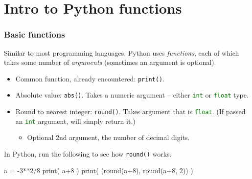 \documentclass{beamer}
\newenvironment{codeblock}
    {\hfill\begin{beamerboxesrounded}[lower=codecol, width=0.8\textwidth]
    \medskip

    }
    { 
    \end{beamerboxesrounded}\hfill
    }
\theoremstyle{example}
\newcommand{\ct}[1]{\lstinline[language=Python,basicstyle=\ttfamily\footnotesize,stringstyle=\small\color{strings}]!#1!}
\newcommand{\ttt}[1]{{\small\texttt{#1}}}
\begin{document}
\section{Intro to Python functions}

\begin{frame}[fragile]
\frametitle{Basic functions}

Similar to most programming languages, Python uses \emph{functions}, each of which takes some number of \emph{arguments} (sometimes an argument is optional).

\pause
\begin{itemize}
	\item Common function, already encountered: \ttt{print()}.
	\pause
	\item Absolute value: \ttt{abs()}. Takes a numeric argument {--} either \ct{int} or \ct{float} type.
	\pause
	\item Round to nearest integer: \ttt{round()}. Takes argument that is \ct{float}. (If passed an \ct{int} argument, will simply return it.)
	\begin{itemize}
		\item Optional 2nd argument, the number of decimal digits.
	\end{itemize}
\end{itemize}
\pause
In Python, run the following to see how \ttt{round()} works.

\begin{codeblock}

\begin{python}
a = -3**2/8
print( a+8 )
print( (round(a+8), round(a+8, 2)) )
\end{python}

\end{codeblock}

\end{frame}
\end{document}
